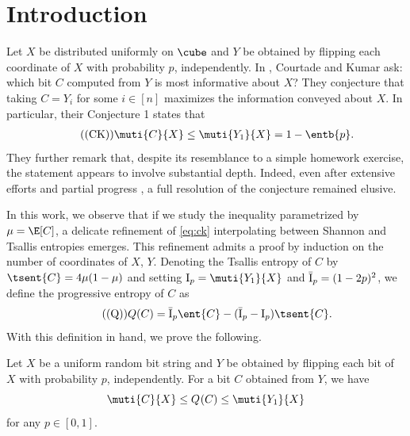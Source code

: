 \section{Introduction}
\label{sec:introduction}
Let $X$ be distributed uniformly on $\cube$ and $Y$
be obtained by flipping each coordinate of $X$ with
probability $p$, independently.
In \cite{KumarC2013,CourtadeK2014}, Courtade and Kumar ask:
which bit $C$ computed from $Y$ is most informative about
$X$?
They conjecture that taking $C=Y_i$ for some $i\in[n]$
maximizes the information conveyed about $X$. In particular,
their Conjecture 1 states that 
\begin{align}
\label{eq:ck}\tag{(CK)}
\muti{C}{X}\le\muti{Y_1}{X} = 1 - \entb{p}.
\end{align}
They further remark that, despite its resemblance to a
simple homework exercise, the statement appears to
involve substantial depth. Indeed, even after extensive
efforts and partial progress
\cite{AnantharamBCJN2017,AnantharamGKN2013,Arikan2009,BarnesO2020,
CalmonMMV+2017,ChenN2024,DurcikIRX2026,EldanMR2023,
FischerKRSS2004,HanOS2016,JavanmardW2026,KindlerOW2015,LiM2021,
OrdentlichSW2015,ParnasRS2002,PichlerPM2018,Samorodnitsky2015,
Samorodnitsky2016,Sarbu2017,YangW2018,Yu2023,Yu2024},
a full resolution of the conjecture remained elusive.


In this work, we observe that if we study the inequality
parametrized by $\mu=\E[C]$, a delicate refinement
of \eqref{eq:ck} interpolating between Shannon and Tsallis
entropies emerges. This refinement admits a proof by induction
on the number of coordinates of $X$, $Y\!$.
Denoting the Tsallis entropy of $C$ by $\tsent{C} = 4\mu(1-\mu)$
and setting $\sI = \muti{Y_1}{X}$ and $\bar{\mathrm{I}}_p = (1-2p)^2$, we define
the progressive entropy of $C$ as
\begin{equation}
\label{eq:Q}\tag{(Q)}
  \Q=\qI\ent{C}-(\qI-\sI)\tsent{C}.
\end{equation}
With this definition in hand, we prove the following.
\begin{theorem}
\label{thm:ck+}
Let $X$ be a uniform random bit string and $Y$ be obtained
by flipping each bit of $X$ with probability $p$,
independently. For a bit $C$ obtained from $Y\!$, we have
\begin{equation*}
\muti{C}{X}\le\qent{C}\le \muti{Y_1}{X}
\end{equation*}
for any $p\in[0,1]$.
\end{theorem}

